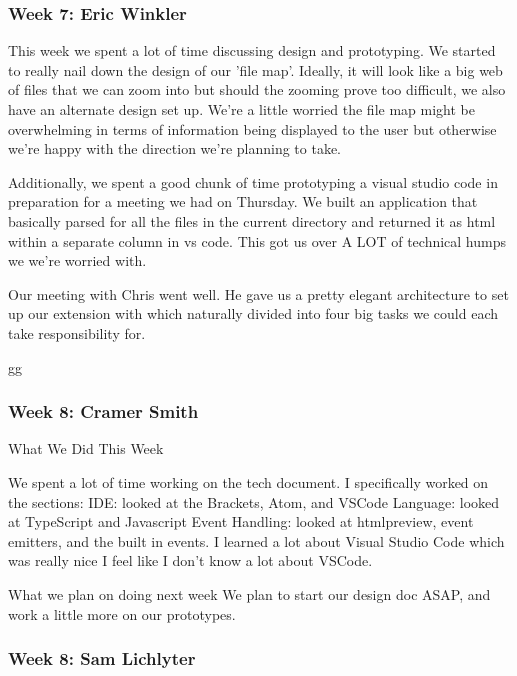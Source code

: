 \subsubsection{Week 7: Eric Winkler}

This week we spent a lot of time discussing design and prototyping. 
We started to really nail down the design of our 'file map'. Ideally, it will look like a big web of files that we can zoom into but should the zooming prove too difficult, we also have an alternate design set up. We're a little worried the file map might be overwhelming in terms of information being displayed to the user but otherwise we're happy with the direction we're planning to take.

Additionally, we spent a good chunk of time prototyping a visual studio code in preparation for a meeting we had on Thursday. We built an application that basically parsed for all the files in the current directory and returned it as html within a separate column in vs code. This got us over A LOT of technical humps we we're worried with.

Our meeting with Chris went well. He gave us a pretty elegant architecture to set up our extension with which naturally divided into four big tasks we could each take responsibility for.

gg

\subsubsection{Week 8: Cramer Smith}

What We Did This Week

We spent a lot of time working on the tech document. I specifically worked on the sections:
 IDE: looked at the Brackets, Atom, and VSCode
 Language: looked at TypeScript and Javascript
 Event Handling: looked at htmlpreview, event emitters, and the built in events.
I learned a lot about Visual Studio Code which was really nice I feel like I don't know a lot about VSCode.

What we plan on doing next week
We plan to start our design doc ASAP, and work a little more on our prototypes. 


\subsubsection{Week 8: Sam Lichlyter}

